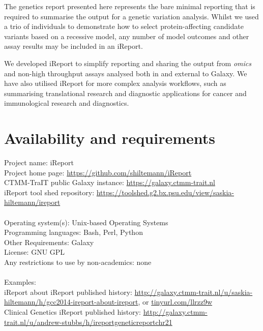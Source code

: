 The genetics report presented here represents the bare minimal reporting that is required to summarise the output for a genetic variation analysis. Whilst we used a trio of individuals to demonstrate how to select protein-affecting candidate variants based on a recessive model, any number of model outcomes and other assay results may be included in an iReport.

We developed iReport to simplify reporting and sharing the output from \emph{omics} and non-high throughput assays analysed both in and external to Galaxy. We have also utilised iReport for more complex analysis workflows, such as summarising translational research and diagnostic applications for cancer and immunological research and diagnostics.

\section*{Availability and requirements}
Project name: iReport \\
Project home page: \url{https://github.com/shiltemann/iReport} \\
CTMM-TraIT public Galaxy instance: \url{https://galaxy.ctmm-trait.nl} \\
iReport tool shed repository: \url{https://toolshed.g2.bx.psu.edu/view/saskia-hiltemann/ireport} \\
\ \\
Operating system(s): Unix-based Operating Systems \\
Programming languages: Bash, Perl, Python \\
Other Requirements: Galaxy \\
License: GNU GPL \\
Any restrictions to use by non-academics: none \\
\ \\
Examples: \\
iReport about iReport published history:
\url{http://galaxy.ctmm-trait.nl/u/saskia-hiltemann/h/gcc2014-ireport-about-ireport}, or \url{tinyurl.com/llrzz9w} \\
Clinical Genetics iReport published history:
\url{http://galaxy.ctmm-trait.nl/u/andrew-stubbs/h/ireportgeneticreportchr21} \\


